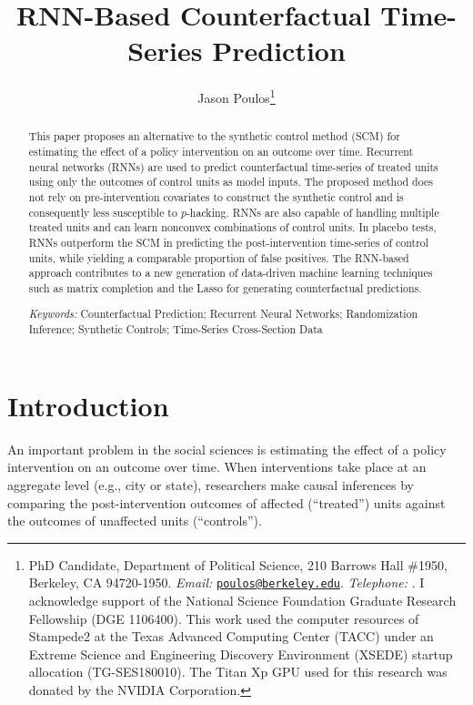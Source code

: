 \documentclass[hidelinks,12pt]{article}
\title{RNN-Based Counterfactual Time-Series Prediction}
\author[ ]{Jason Poulos\thanks{PhD Candidate, Department of Political Science, 210 Barrows Hall \#1950, Berkeley, CA 94720-1950. \emph{Email:} \href{mailto:poulos@berkeley.edu}{\nolinkurl{poulos@berkeley.edu}}. \emph{Telephone:} \Plus 1\Minus 510\Minus 642\Minus 6323. I acknowledge support of the National Science Foundation Graduate Research Fellowship (DGE 1106400). This work used the computer resources of Stampede2 at the Texas Advanced Computing Center (TACC) under an Extreme Science and Engineering Discovery Environment (XSEDE) startup allocation (TG-SES180010). The Titan Xp GPU used for this research was donated by the NVIDIA Corporation.}}
\affil[ ]{University of California, Berkeley}
\date{}
\begin{document}
 
 
\begin{singlespacing}
\maketitle  
\end{singlespacing}
\thispagestyle{empty}

\begin{abstract}  %
\noindent 
This paper proposes an alternative to the synthetic control method (SCM) for estimating the effect of a policy intervention on an outcome over time. Recurrent neural networks (RNNs) are used to predict counterfactual time-series of treated units using only the outcomes of control units as model inputs. The proposed method does not rely on pre-intervention covariates to construct the synthetic control and is consequently less susceptible to $p$-hacking. RNNs are also capable of handling multiple treated units and can learn nonconvex combinations of control units. In placebo tests, RNNs outperform the SCM in predicting the post-intervention time-series of control units, while yielding a comparable proportion of false positives. The RNN-based approach contributes to a new generation of data-driven machine learning techniques such as matrix completion and the Lasso for generating counterfactual predictions.
\\
\begin{singlespace}
	\emph{Keywords:} Counterfactual Prediction; Recurrent Neural Networks; Randomization Inference; Synthetic Controls; Time-Series Cross-Section Data
\end{singlespace}
\end{abstract}

\pagebreak
{}%

\section{Introduction} 

An important problem in the social sciences is estimating the effect of a policy intervention on an outcome over time. When interventions take place at an aggregate level (e.g., city or state), researchers make causal inferences by comparing the post-intervention outcomes of affected (``treated'') units against the outcomes of unaffected units (``controls'').
\end{document}
